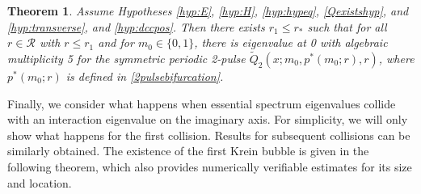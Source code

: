 \documentclass[10pt,reqno]{amsart}
\theoremstyle{plain}
\newtheorem{theorem}{Theorem}
\theoremstyle{definition}
\theoremstyle{remark}
\numberwithin{theorem}{section}
\numberwithin{equation}{section}
\begin{document}
\begin{theorem}\label{theorem:2peigssym}
Assume Hypotheses \ref{hyp:E}, \ref{hyp:H}, \ref{hyp:hypeq}, \ref{Qexistshyp}, and \ref{hyp:transverse}, and \ref{hyp:dccpos}. Then there exists $r_1 \leq r_*$ such that for all $r \in \mathcal{R}$ with $r \leq r_1$ and for $m_0 \in \{0, 1\}$, there is eigenvalue at 0 with algebraic multiplicity 5 for the symmetric periodic 2-pulse $\tilde{Q}_2(x; m_0, p^*(m_0; r), r)$, where $p^*(m_0; r)$ is defined in \cref{2pulsebifurcation}.
\end{theorem}

Finally, we consider what happens when essential spectrum eigenvalues collide with an interaction eigenvalue on the imaginary axis. For simplicity, we will only show what happens for the first collision. Results for subsequent collisions can be similarly obtained. The existence of the first Krein bubble is given in the following theorem, which also provides numerically verifiable estimates for its size and location. 
\end{document}
